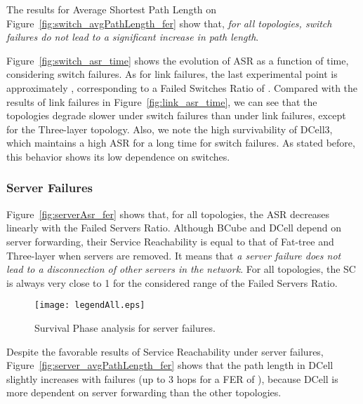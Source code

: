 The results for Average Shortest Path Length on Figure~\ref{fig:switch_avgPathLength_fer} show that, \textit{for all topologies, switch failures do not lead to a significant increase in path length}.

Figure~\ref{fig:switch_asr_time} shows the evolution of ASR as a function of time, considering switch failures. As for link failures, the last experimental point is approximately , corresponding to a Failed Switches Ratio of . Compared with the results of link failures in Figure~\ref{fig:link_asr_time}, we can see that the topologies degrade slower under switch failures than under link failures, except for the Three-layer topology. Also, we note the high survivability of DCell3, which maintains a high ASR for a long time for switch failures. As stated before, this behavior shows its low dependence on switches.

\subsubsection{Server Failures}
\label{sec:perfEvaluationServerSurvival}

Figure~\ref{fig:serverAsr_fer} shows that, for all topologies, the ASR decreases linearly with the Failed Servers Ratio. Although BCube and DCell depend on server forwarding, their Service Reachability is equal to that of Fat-tree and Three-layer when servers are removed. It means that \textit{a server failure does not lead to a disconnection of other servers in the network}. For all topologies, the SC is always very close to 1 for the considered range of the Failed Servers Ratio.
\begin{figure}
\centering
{}
{\texttt{[image: legendAll.eps]}}
\caption{Survival Phase analysis for server failures.}
\end{figure}

Despite the favorable results of Service Reachability under server failures, Figure~\ref{fig:server_avgPathLength_fer} shows that the path length in DCell slightly increases with failures (up to 3 hops for a FER of ), because DCell is more dependent on server forwarding than the other topologies. 

